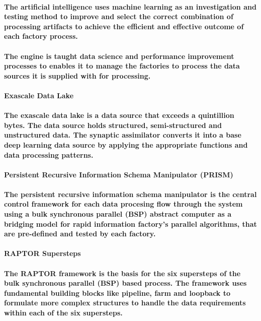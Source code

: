 \documentclass{acm_proc_article-sp}
\begin{document}
\paragraph{The artificial intelligence uses machine learning as an investigation and testing method to improve and select the correct combination of processing artifacts to achieve the efficient and effective outcome of each factory process.}
\paragraph{The engine is taught data science and performance improvement processes to enables it to manage the factories to process the data sources it is supplied with for processing.}
\paragraph{\textbf{Exascale Data Lake}}
\paragraph{The exascale data lake is a data source that exceeds a quintillion bytes. The data source holds structured, semi-structured and unstructured data. The synaptic assimilator converts it into a base deep learning data source by applying the appropriate functions and data processing patterns.}
\paragraph{\textbf{Persistent Recursive Information Schema Manipulator (PRISM)}}
\paragraph{The persistent recursive information schema manipulator is the central control framework for each data procesing flow through the system using a bulk synchronous parallel (BSP) abstract computer as a bridging model for rapid information factory's parallel algorithms, that are pre-defined and tested by each factory.}
\paragraph{\textbf{RAPTOR Supersteps}}
\paragraph{The RAPTOR framework is the basis for the six supersteps of the bulk synchronous parallel (BSP) based process. The framework uses fundamental building blocks like pipeline, farm and loopback to formulate more complex structures to handle the data requirements within each of the six supersteps.}
\end{document}
